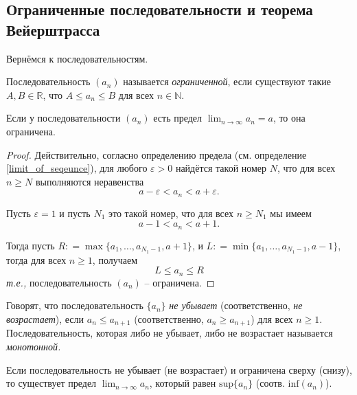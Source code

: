 \subsection{Ограниченные последовательности и теорема Вейерштрасса}

Вернёмся к последовательностям.

\begin{definition}
    Последовательность $(a_n)$ называется \textit{ограниченной}, если существуют такие $A,B \in \mathbb{R}$, что $A\le a_n \le B$ для всех $n\in\mathbb{N}.$
\end{definition}

\begin{lemma}\label{lim-->bounded_for_sequence}
    Если у последовательности $(a_n)$ есть предел $\lim_{n \to \infty} a_n = a$, то она ограничена.
\end{lemma}

\begin{proof}
    Действительно, согласно определению предела (см. определение \ref{limit_of_seqeunce}), для любого $\varepsilon>0$ найдётся такой номер $N$, что для всех $n \ge N$ выполняются неравенства
    \[
     a- \varepsilon < a_n < a+\varepsilon.
    \]

Пусть $\varepsilon = 1$ и пусть $N_1$ это такой номер, что для всех $n\ge N_1$ мы имеем
\[
     a-1 < a_n < a+1.
\]

Тогда пусть $R: = \max \{a_1, \ldots, a_{N_1 -1}, a+1\}$, и $L: = \min \{a_1,\ldots, a_{N_1 -1}, a-1\}$, тогда для всех $n\ge 1$, получаем
\[
 L \le a_n \le R
\]
\textit{т.е.,} последовательность $(a_n)$ -- ограничена.
\end{proof}


\begin{definition}
    Говорят, что последовательность $\{a_n\}$ \textit{не убывает} (соответственно, \textit{не возрастает}), если $a_n \le a_{n+1}$ (соответственно, $a_n \ge a_{n+1}$) для всех $n \ge 1.$ Последовательность, которая либо не убывает, либо не возрастает называется \textit{монотонной.}
\end{definition}


\begin{theorem}[{\bf Вейерштрасс}]\label{Weierstrass}
    Если последовательность не убывает (не возрастает) и ограничена сверху (снизу), то существует предел $\lim_{n \to \infty}a_n$, который равен $\mathrm{sup}\{a_n\}$ (соотв. $\mathrm{inf}(a_n)$).
\end{theorem}

